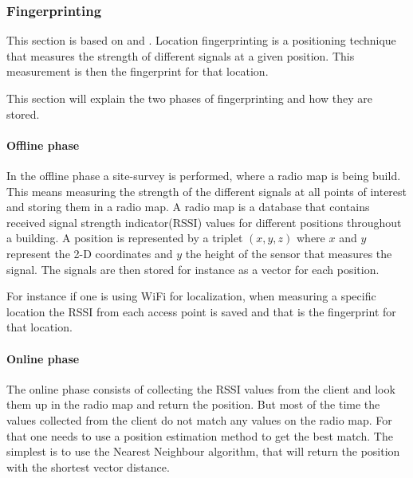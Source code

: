 \subsubsection{Fingerprinting}\label{fingerprinting}
This section is based on \citet{fingerprinting_slides} and \citet{fingerprinting}.
Location fingerprinting is a positioning technique that measures the strength of different signals at a given position.
This measurement is then the fingerprint for that location.

This section will explain the two phases of fingerprinting and how they are stored.
\paragraph{Offline phase}
In the offline phase a site-survey is performed, where a radio map is being build.
This means measuring the strength of the different signals at all points of interest and storing them in a radio map.
A radio map is a database that contains received signal strength indicator(RSSI) values for different positions throughout a building.
A position is represented by a triplet $(x,y,z)$ where $x$ and $y$ represent the 2-D coordinates and $y$ the height of the sensor that measures the signal.
The signals are then stored for instance as a vector for each position.

For instance if one is using WiFi for localization, when measuring a specific location the RSSI from each access point is saved and that is the fingerprint for that location.

\paragraph{Online phase}
The online phase consists of collecting the RSSI values from the client and look them up in the radio map and return the position.
But most of the time the values collected from the client do not match any values on the radio map.
For that one needs to use a position estimation method to get the best match.
The simplest is to use the Nearest Neighbour algorithm, that will return the position with the shortest vector distance.
